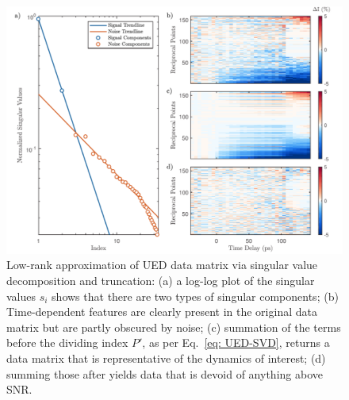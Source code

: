 \begin{figure}[t!]
  \centering
  \includegraphics[width = \textwidth]{Figures/fig_UED_svd.pdf}
  \caption[Low-rank approximation of UED data matrix via singular value decomposition and truncation.]{
  Low-rank approximation of UED data matrix via singular value decomposition and truncation:
  (a) a log-log plot of the singular values $s_i$ shows that there are two types of singular components;
  (b) Time-dependent features are clearly present in the original data matrix but are partly obscured by noise;
  (c) summation of the terms before the dividing index $P'$, as per Eq.~\eqref{eq: UED-SVD}, returns a data matrix that is representative of
  the dynamics of interest;
  (d) summing those after yields data that is devoid of anything above SNR.
  }
  \label{fig: UED-svd}
\end{figure}

